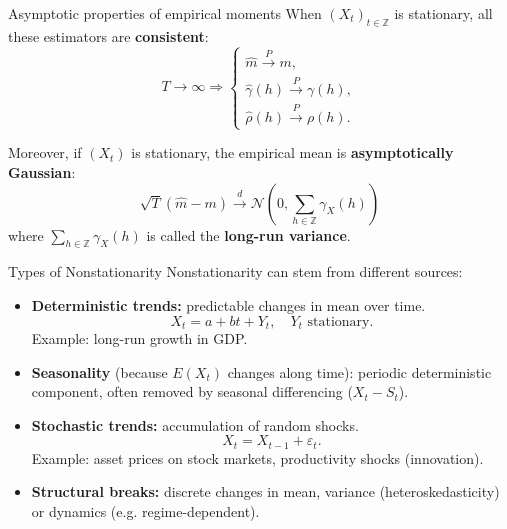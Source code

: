 \documentclass{beamer}
\begin{document}

\begin{frame}{Asymptotic properties of empirical moments}
\small
When $(X_t)_{t \in \mathbb{Z}}$ is stationary, all these estimators are \textbf{consistent}:
\[
T \to \infty \Rightarrow
\begin{cases}
\hat m \xrightarrow{P} m, \\
\hat \gamma(h) \xrightarrow{P} \gamma(h), \\
\hat \rho(h) \xrightarrow{P} \rho(h).
\end{cases}
\]

\vspace{0.3cm}
Moreover, if $(X_t)$ is stationary, the empirical mean is \textbf{asymptotically Gaussian}:
\[
\sqrt{T}(\hat m - m) \xrightarrow{d} \mathcal{N}\!\left(0, \sum_{h \in \mathbb{Z}} \gamma_X(h)\right)
\]
where $\sum_{h \in \mathbb{Z}} \gamma_X(h)$ is called the \textbf{long-run variance}.
\end{frame}



\begin{frame}{Types of Nonstationarity}
\small
Nonstationarity can stem from different sources:

\begin{itemize}
  \item \textbf{Deterministic trends:} predictable changes in mean over time.
  \[
  X_t = a + bt + Y_t, \quad Y_t \text{ stationary.}
  \]
  Example: long-run growth in GDP.

\item \textbf{Seasonality} (because $E(X_t)$ changes along time): periodic deterministic component, often removed by seasonal differencing ($X_t-S_t$).

  \item \textbf{Stochastic trends:} accumulation of random shocks.
  \[
  X_t = X_{t-1} + \varepsilon_t.
  \]
  Example: asset prices on stock markets, productivity shocks (innovation).

  \item \textbf{Structural breaks:} discrete changes in mean, variance (heteroskedasticity) or dynamics (e.g. regime-dependent).

\end{itemize}

\end{frame}
\end{document}
